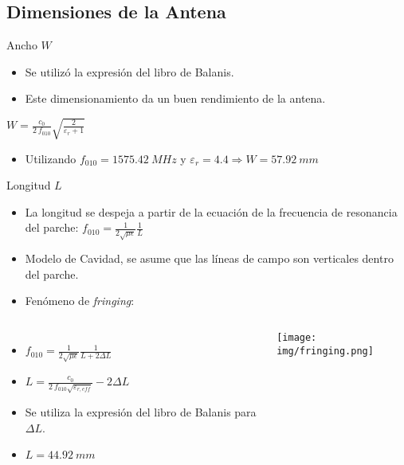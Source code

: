 \subsection{Dimensiones de la Antena}
\begin{frame}{Ancho $W$}
    \begin{itemize}
        \item<1-> Se utilizó la expresión del libro de Balanis.
        \item<2-> Este dimensionamiento da un buen rendimiento de la antena.
    \end{itemize}

    \begin{center}
        $W = \frac{c_0}{2 \ f_{010}} \sqrt{\frac{2}{\varepsilon_r+1}}$
    \end{center}

    \begin{itemize}
        \item<4-> Utilizando $f_{010} = 1575.42 \ MHz$ y $\varepsilon_r = 4.4 \Rightarrow W = 57.92 \ mm$
    \end{itemize}
\end{frame}

\begin{frame}{Longitud $L$}

    \begin{itemize}
        \item<1-> La longitud se despeja a partir de la ecuación de la frecuencia de resonancia del parche: $f_{010} = \frac{1}{2 \sqrt{\mu \epsilon}} \frac{1}{L}$
        \item<2-> Modelo de Cavidad, se asume que las líneas de campo son verticales dentro del parche.
        \item<3-> Fenómeno de \textit{fringing}:
    \end{itemize}
    \begin{columns}
            \begin{itemize}
                \item<4-> $f_{010} = \frac{1}{2 \sqrt{\mu \epsilon}} \frac{1}{L + 2 \Delta L}$
                \item<5-> $L = \frac{c_0}{2 \ f_{010} \sqrt{\varepsilon_{r,eff}}} - 2 \Delta L$
                \item<6-> Se utiliza la expresión del libro de Balanis para $\Delta L$.
                \item<7-> $L = 44.92 \ mm$
            \end{itemize}
            \texttt{[image: img/fringing.png]}
    \end{columns}
\end{frame}

